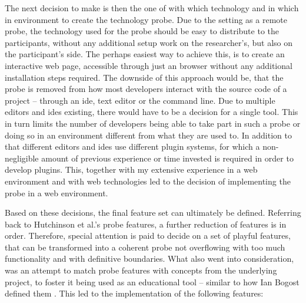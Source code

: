 The next decision to make is then the one of with which technology and in which in environment to create the technology probe. Due to the setting as a remote probe, the technology used for the probe should be easy to distribute to the participants, without any additional setup work on the researcher's, but also on the participant's side. The perhaps easiest way to achieve this, is to create an interactive web page, accessible through just an browser without any additional installation steps required. The downside of this approach would be, that the probe is removed from how most developers interact with the source code of a project -- through an \gls{ide}, text editor or the command line. Due to multiple editors and \gls{ide}s existing, there would have to be a decision for a single tool. This in turn limits the number of developers being able to take part in such a probe or doing so in an environment different from what they are used to. In addition to that different editors and \gls{ide}s use different plugin systems, for which a non-negligible amount of previous experience or time invested is required in order to develop plugins. This, together with my extensive experience in a web environment and with web technologies led to the decision of implementing the probe in a web environment.

Based on these decisions, the final feature set can ultimately be defined. Referring back to Hutchinson et al.'s probe features, a further reduction of features is in order. Therefore, special attention is paid to decide on a set of playful features, that can be transformed into a coherent probe not overflowing with too much functionality and with definitive boundaries. What also went into consideration, was an attempt to match probe features with concepts from the underlying project, to foster it being used as an educational tool -- similar to how Ian Bogost defined them \cite{bogost2007persuasive}. This led to the implementation of the following features:

